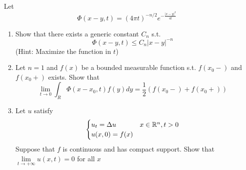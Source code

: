 Let
$$
\Phi(x - y, t) = (4 \pi t)^{-n / 2} e^{-\frac{|x - y|^2}{4t}}
$$
\begin{enumerate}
\item Show that there exists a generic constant $C_n$ s.t.
  $$
  \Phi(x - y, t) \leq C_n |x - y|^{-n}
  $$
  (Hint: Maximize the function in $t$)
\item
  Let $n = 1$ and $f(x)$ be a bounded measurable function s.t. $f(x_0 -)$ and $f(x_0+)$ exists.
  Show that
  $$
  \lim \limits_{t \rightarrow 0} \int_R \Phi(x  - x_0, t) f(y) dy = \frac{1}{2} (f(x_0-) + f(x_0+))
  $$
\item
  Let $u$ satisfy
  $$
  \begin{cases}
    u_t = \Delta u & x \in \mathbb{R}^n, t > 0\\
    u(x, 0) = f(x)
  \end{cases}
  $$
  Suppose that $f$ is continuous and has compact support.
  Show that $\lim \limits_{t \rightarrow +\infty} u(x, t) = 0$ for all $x$
\end{enumerate}
